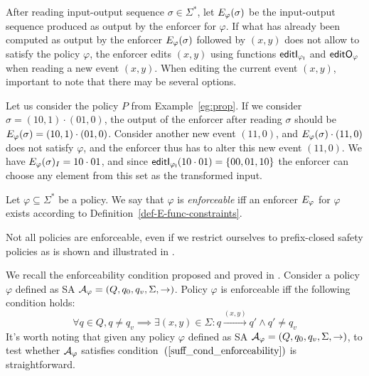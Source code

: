 \begin{remark}
	\label{rem:edt}
	After reading input-output sequence $\sigma \in \Sigma^*$, let $E_{\varphi}(\sigma)$ be the input-output sequence produced as output by the enforcer for $\varphi$.
	If what has already been computed as output by the enforcer $E_{\varphi}(\sigma)$ followed by $(x,y)$ does not allow to satisfy the policy $\varphi$, the enforcer edits $(x,y)$ using functions $\mathsf{editI_{\varphi_I}}$ and $\mathsf{editO_{\varphi}}$ when reading a new event $(x,y)$.
	When editing the current event $(x,y)$, important to note that there may be several options.
	
	Let us consider the policy $P$ from Example~\ref{eg:prop}.
	If we consider $\sigma = (10,1)\cdot(01,0)$, the output of the enforcer after reading $\sigma$ should be $E_{\varphi}(\sigma) = (10,1)\cdot(01,0)$.
	Consider another new event $(11,0)$, and $E_{\varphi}(\sigma)\cdot(11,0)$ does not satisfy $\varphi$, and the enforcer thus has to alter this new event $(11,0)$.
	We have $E_{\varphi}(\sigma)_I= 10\cdot01$, and since $\mathsf{editI_{\varphi_I}}(10\cdot01) = \{00,01,10\}$ the enforcer can choose any element from this set as the transformed input.
\end{remark}

\begin{definition}[Enforceability]
	\label{def:Enforceability}
	{Let $\varphi\subseteq\Sigma^*$ be a policy. We say that
		$\varphi$ is {\em enforceable} iff an enforcer $E_{\varphi}$ for $\varphi$ exists according to Definition~\ref{def-E-func-constraints}.}
\end{definition}

\begin{remark}
	Not all policies are enforceable,
	even if we restrict ourselves to prefix-closed safety policies as is shown and illustrated in \cite{spin17}. 
\end{remark}	

\begin{remark}
	\label{rem:nonEnf}
	We recall the enforceability condition proposed and proved in \cite{spin17}.
	Consider a policy $\varphi$ defined as SA ${\cal A}_\varphi=(Q, q_0, q_v, \Sigma, \rightarrow)$.
	Policy $\varphi$ is enforceable iff the following condition holds:
	\begin{equation}
		\label{suff_cond_enforceability}
		\tag{\bf EnfCo}
		\forall q \in Q, q \neq q_v \implies \exists (x,y) \in \Sigma: q \xrightarrow{(x,y)} q' \wedge q'\neq q_v
	\end{equation}
	It's worth noting that given any policy $\varphi$ defined as SA ${\cal A}_\varphi=(Q, q_0, q_v, \Sigma, \rightarrow)$, to test whether ${\cal A}_\varphi$ satisfies condition~$(\ref{suff_cond_enforceability})$ is straightforward.
\end{remark}

